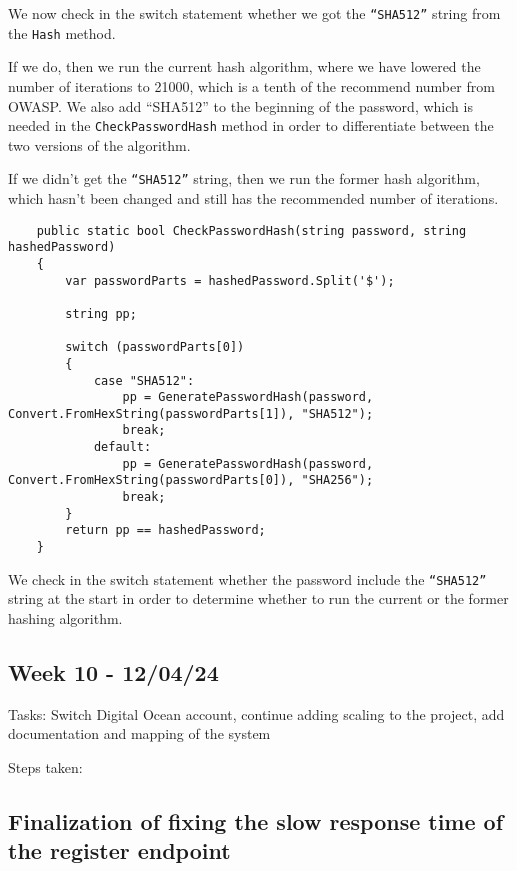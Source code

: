 We now check in the switch statement whether we got the \texttt{“SHA512”} string from the \texttt{Hash} method.

If we do, then we run the current hash algorithm, where we have lowered the number of iterations to 21000, which is a tenth of the recommend number from OWASP. We also add ``SHA512'' to the beginning of the password, which is needed in the \texttt{CheckPasswordHash} method in order to differentiate between the two versions of the algorithm.

If we didn't get the \texttt{“SHA512”} string, then we run the former hash algorithm, which hasn't been changed and still has the recommended number of iterations.

\begin{verbatim}
    public static bool CheckPasswordHash(string password, string hashedPassword)
    {
        var passwordParts = hashedPassword.Split('$');

        string pp;

        switch (passwordParts[0])
        {
            case "SHA512":
                pp = GeneratePasswordHash(password, Convert.FromHexString(passwordParts[1]), "SHA512");
                break;
            default:
                pp = GeneratePasswordHash(password, Convert.FromHexString(passwordParts[0]), "SHA256");
                break;
        }
        return pp == hashedPassword;
    }
\end{verbatim}

We check in the switch statement whether the password include the \texttt{“SHA512”} string at the start in order to determine whether to run the current or the former hashing algorithm.

\subsection{Week 10 - 12/04/24}
\label{log:week10}

Tasks: Switch Digital Ocean account, continue adding scaling to the project, add documentation and mapping of the system

Steps taken:

\subsection{Finalization of fixing the slow response time of the register endpoint}
\label{log:finalization-of-fixing-the-slow-response-time-of-the-register-endpoint}

